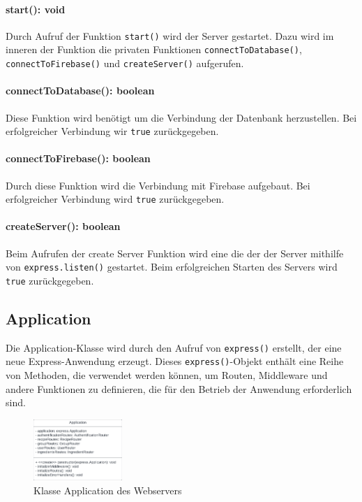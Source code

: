 \documentclass{entwurfsheft}
\begin{document}
\paragraph{start(): void}
Durch Aufruf der Funktion \texttt{start()} wird der Server gestartet. Dazu wird im inneren der Funktion die privaten Funktionen \texttt{connectToDatabase()}, \texttt{connectToFirebase()} und \texttt{createServer()} aufgerufen.
\paragraph{connectToDatabase(): boolean}
Diese Funktion wird benötigt um die Verbindung der Datenbank herzustellen. Bei erfolgreicher Verbindung wir \texttt{true} zurückgegeben.
\paragraph{connectToFirebase(): boolean}
Durch diese Funktion wird die Verbindung mit Firebase aufgebaut. Bei erfolgreicher Verbindung wird \texttt{true} zurückgegeben.
\paragraph{createServer(): boolean}
Beim Aufrufen der create Server Funktion wird eine die der der Server mithilfe von \texttt{express.listen()} gestartet. Beim erfolgreichen Starten des Servers wird \texttt{true} zurückgegeben.

\newpage

\subsection{Application}\label{sec:Application}
Die Application-Klasse wird durch den Aufruf von \texttt{express()} erstellt, der eine neue Express-Anwendung erzeugt. Dieses \texttt{express()}-Objekt enthält eine Reihe von Methoden, die verwendet werden können, um Routen, Middleware und andere Funktionen zu definieren, die für den Betrieb der Anwendung erforderlich sind.

\begin{figure}[htp]
    \centering
    \includegraphics[width = 0.3\textwidth]{images/webserver/application.pdf}
    \caption{Klasse Application des Webservers}
    \label{fig:application}
\end{figure}
\end{document}
